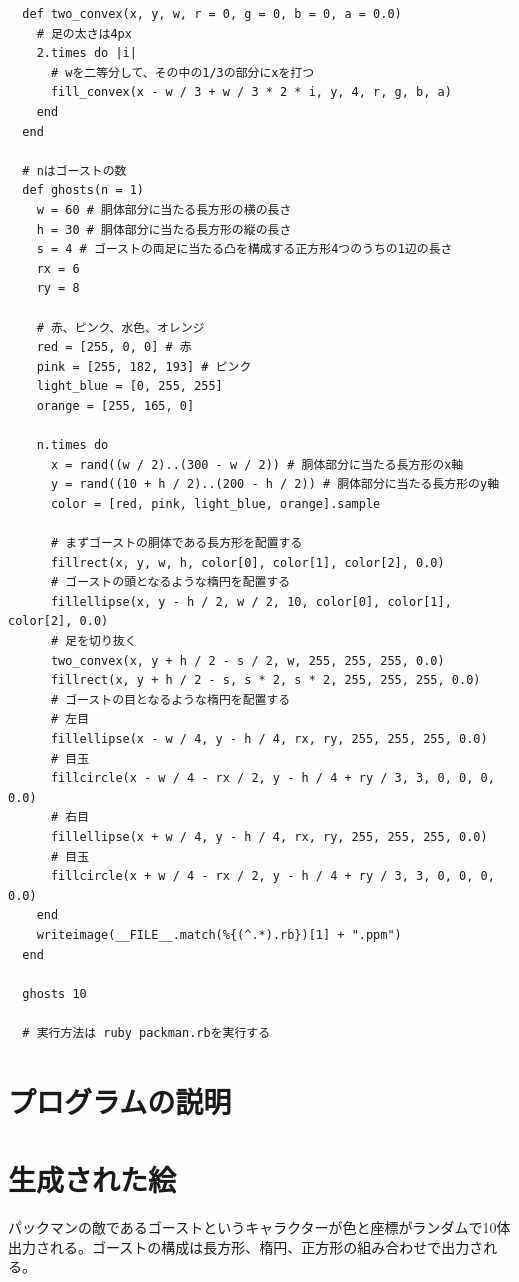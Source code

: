 \documentclass[12pt,a4j]{jarticle}
\begin{document}
\begin{verbatim}
  def two_convex(x, y, w, r = 0, g = 0, b = 0, a = 0.0)
    # 足の太さは4px
    2.times do |i|
      # wを二等分して、その中の1/3の部分にxを打つ
      fill_convex(x - w / 3 + w / 3 * 2 * i, y, 4, r, g, b, a)
    end
  end

  # nはゴーストの数
  def ghosts(n = 1)
    w = 60 # 胴体部分に当たる長方形の横の長さ
    h = 30 # 胴体部分に当たる長方形の縦の長さ
    s = 4 # ゴーストの両足に当たる凸を構成する正方形4つのうちの1辺の長さ
    rx = 6
    ry = 8

    # 赤、ピンク、水色、オレンジ
    red = [255, 0, 0] # 赤
    pink = [255, 182, 193] # ピンク
    light_blue = [0, 255, 255]
    orange = [255, 165, 0]

    n.times do
      x = rand((w / 2)..(300 - w / 2)) # 胴体部分に当たる長方形のx軸
      y = rand((10 + h / 2)..(200 - h / 2)) # 胴体部分に当たる長方形のy軸
      color = [red, pink, light_blue, orange].sample

      # まずゴーストの胴体である長方形を配置する
      fillrect(x, y, w, h, color[0], color[1], color[2], 0.0)
      # ゴーストの頭となるような楕円を配置する
      fillellipse(x, y - h / 2, w / 2, 10, color[0], color[1], color[2], 0.0)
      # 足を切り抜く
      two_convex(x, y + h / 2 - s / 2, w, 255, 255, 255, 0.0)
      fillrect(x, y + h / 2 - s, s * 2, s * 2, 255, 255, 255, 0.0)
      # ゴーストの目となるような楕円を配置する
      # 左目
      fillellipse(x - w / 4, y - h / 4, rx, ry, 255, 255, 255, 0.0)
      # 目玉
      fillcircle(x - w / 4 - rx / 2, y - h / 4 + ry / 3, 3, 0, 0, 0, 0.0)
      # 右目
      fillellipse(x + w / 4, y - h / 4, rx, ry, 255, 255, 255, 0.0)
      # 目玉
      fillcircle(x + w / 4 - rx / 2, y - h / 4 + ry / 3, 3, 0, 0, 0, 0.0)
    end
    writeimage(__FILE__.match(%{(^.*).rb})[1] + ".ppm")
  end

  ghosts 10

  # 実行方法は ruby packman.rbを実行する

\end{verbatim}

\section{プログラムの説明}

\section{生成された絵}

パックマンの敵であるゴーストというキャラクターが色と座標がランダムで10体出力される。ゴーストの構成は長方形、楕円、正方形の組み合わせで出力される。
\end{document}
